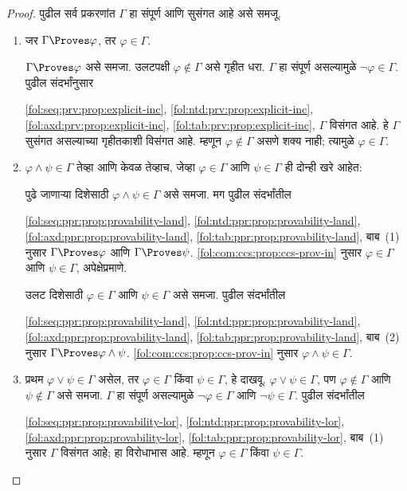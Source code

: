 \begin{proof}
पुढील सर्व प्रकरणांत $\Gamma$ हा संपूर्ण आणि सुसंगत आहे असे समजू.
\begin{enumerate}
\item जर $\Gamma \Proves \varphi$, तर $\varphi \in \Gamma$.

$\Gamma \Proves \varphi$ असे समजा. उलटपक्षी $\varphi \notin \Gamma$ असे गृहीत
धरा. $\Gamma$ हा संपूर्ण असल्यामुळे $\lnot \varphi \in \Gamma$. पुढील
संदर्भांनुसार

  \ref{fol:seq:prv:prop:explicit-inc}, \ref{fol:ntd:prv:prop:explicit-inc}, \ref{fol:axd:prv:prop:explicit-inc}, \ref{fol:tab:prv:prop:explicit-inc},
$\Gamma$ विसंगत आहे. हे $\Gamma$ सुसंगत असल्याच्या गृहीतकाशी विसंगत आहे.
म्हणून $\varphi \notin \Gamma$ असणे शक्य नाही; त्यामुळे $\varphi \in \Gamma$.

\item

$\varphi \land \psi \in \Gamma$ तेव्हा आणि केवळ तेव्हाच, जेव्हा $\varphi \in
\Gamma$ आणि $\psi \in \Gamma$ ही दोन्ही खरे आहेत:

पुढे जाणाऱ्या दिशेसाठी $\varphi \land \psi \in \Gamma$ असे समजा. मग
पुढील संदर्भांतील

  \ref{fol:seq:ppr:prop:provability-land}, \ref{fol:ntd:ppr:prop:provability-land}, \ref{fol:axd:ppr:prop:provability-land}, \ref{fol:tab:ppr:prop:provability-land}, बाब~(1) नुसार
$\Gamma \Proves \varphi$ आणि $\Gamma \Proves \psi$. \ref{fol:com:ccs:prop:ccs-prov-in}
नुसार $\varphi \in \Gamma$ आणि $\psi \in \Gamma$, अपेक्षेप्रमाणे.

उलट दिशेसाठी $\varphi \in \Gamma$ आणि $\psi \in \Gamma$ असे समजा. पुढील
संदर्भांतील

  \ref{fol:seq:ppr:prop:provability-land}, \ref{fol:ntd:ppr:prop:provability-land}, \ref{fol:axd:ppr:prop:provability-land}, \ref{fol:tab:ppr:prop:provability-land}, बाब~(2) नुसार
$\Gamma \Proves \varphi \land \psi$. \ref{fol:com:ccs:prop:ccs-prov-in} नुसार $\varphi \land
\psi \in \Gamma$.

\item

प्रथम $\varphi \lor \psi \in \Gamma$ असेल, तर $\varphi \in \Gamma$ किंवा $\psi \in
\Gamma$, हे दाखवू. $\varphi \lor \psi \in \Gamma$, पण $\varphi \notin \Gamma$ आणि
$\psi \notin \Gamma$ असे समजा. $\Gamma$ हा संपूर्ण असल्यामुळे
$\lnot \varphi \in \Gamma$ आणि $\lnot \psi \in \Gamma$. पुढील संदर्भांतील

  \ref{fol:seq:ppr:prop:provability-lor}, \ref{fol:ntd:ppr:prop:provability-lor}, \ref{fol:axd:ppr:prop:provability-lor}, \ref{fol:tab:ppr:prop:provability-lor},
बाब~(1) नुसार $\Gamma$ विसंगत आहे; हा विरोधाभास आहे. म्हणून $\varphi \in
\Gamma$ किंवा $\psi \in \Gamma$.


\end{enumerate}
\end{proof}
